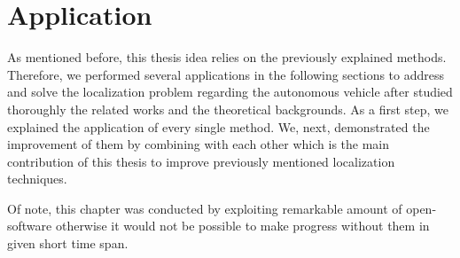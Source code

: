 \chapter{Application}\label{chp:4}
As mentioned before, this thesis idea relies on the previously explained methods. Therefore, we performed several applications in the following sections to address and solve the localization problem regarding the autonomous vehicle after studied thoroughly the related works and the theoretical backgrounds. As a first step, we explained the application of every single method. We, next, demonstrated the improvement of them by combining with each other which is the main contribution of this thesis to improve previously mentioned localization techniques.
\par Of note, this chapter was conducted by exploiting remarkable amount of open-software otherwise it would not be possible to make progress without them in given short time span. 

